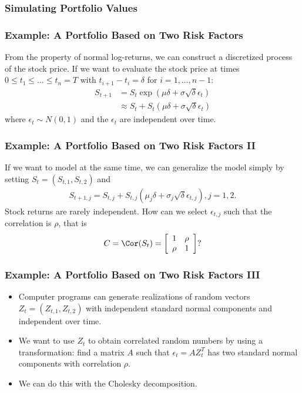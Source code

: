 \subsubsection{Simulating Portfolio Values}



\begin{frame}[fragile]
\frametitle{Example: A Portfolio Based on Two Risk Factors}
From the property of normal log-returns, we can construct a discretized process
of the stock price. If we want to evaluate the stock price at times $0 \leq t_1
\leq \ldots \leq t_n=T$ with $t_{i+1}-t_i=\delta$ for $i=1,\ldots,n-1$:
\begin{align*}
  S_{t+1} &= S_t \exp\left( \mu \delta + \sigma \sqrt{\delta} \epsilon_t
  \right)\\
  &\approx S_{t} + S_{t} \left( \mu \delta + \sigma
  \sqrt{\delta} \epsilon_{t} \right)
\end{align*}
where $\epsilon_t\sim N(0,1)$ and the $\epsilon_t$ are independent over time.
\end{frame}

\begin{frame}[fragile]
\frametitle{Example: A Portfolio Based on Two Risk Factors II}
If we want to model at the same time, we can generalize the model simply by
setting $S_{t}=(S_{t,1},S_{t,2})$ and
\begin{align*}
  S_{t+1,j} = S_{t,j} + S_{t,j} \left( \mu_j \delta + \sigma_j
  \sqrt{\delta} \epsilon_{t,j} \right), j=1,2.
\end{align*}
Stock returns are rarely independent. How can we select $\epsilon_{t,j}$ such
that the correlation is $\rho$, that is
\begin{align*}
  C= \Cor(S_{t}) = \left[ \begin{array}{cc}1 & \rho \\ \rho &1 
  \end{array}\right] ?
\end{align*}
\end{frame}

\begin{frame}[fragile]
\frametitle{Example: A Portfolio Based on Two Risk Factors III}
\begin{itemize}
  \item Computer programs can generate realizations of random vectors
	$Z_t=(Z_{t,1},Z_{t,2})$ with independent standard normal components and
	independent over time.
  \item We want to use $Z_t$ to obtain correlated random numbers by using a
	transformation: find a matrix $A$ such that $\epsilon_t=AZ^T_t$ has two
	standard normal components with correlation $\rho$.
  \item We can do this with the Cholesky decomposition. 
\end{itemize}




\end{frame}

